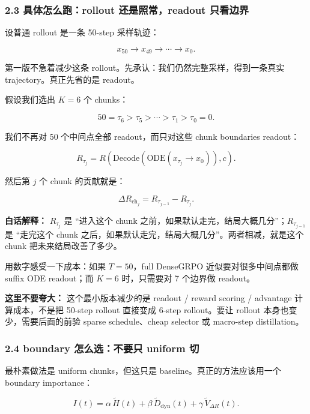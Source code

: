 \subsubsection{2.3 具体怎么跑：rollout 还是照常，readout 只看边界}

设普通 rollout 是一条 50-step 采样轨迹：

\[
x_{50}\rightarrow x_{49}\rightarrow\cdots\rightarrow x_0.
\]

第一版不急着减少这条 rollout。先承认：我们仍然完整采样，得到一条真实 trajectory。真正先省的是 readout。

假设我们选出 \(K=6\) 个 chunks：

\[
50=\tau_6>\tau_5>\cdots>\tau_1>\tau_0=0.
\]

我们不再对 50 个中间点全部 readout，而只对这些 chunk boundaries readout：

\[
R_{\tau_j}
=
R\left(
\mathrm{Decode}\left(
\mathrm{ODE}(x_{\tau_j}\rightarrow x_0)
\right),c
\right).
\]

然后第 \(j\) 个 chunk 的贡献就是：

\[
\Delta R_{\mathrm{ch}_j}
=
R_{\tau_{j-1}}-R_{\tau_j}.
\]

\begin{intubox}
\textbf{白话解释：} \(R_{\tau_j}\) 是 ``进入这个 chunk 之前，如果默认走完，结局大概几分''；\(R_{\tau_{j-1}}\) 是 ``走完这个 chunk 之后，如果默认走完，结局大概几分''。两者相减，就是这个 chunk 把未来结局改善了多少。
\end{intubox}

用数字感受一下成本：如果 \(T=50\)，full DenseGRPO 近似要对很多中间点都做 suffix ODE readout；而 \(K=6\) 时，只需要对 7 个边界做 readout。

\begin{warnbox}
\textbf{这里不要夸大：} 这个最小版本减少的是 readout / reward scoring / advantage 计算成本，不是把 50-step rollout 直接变成 6-step rollout。要让 rollout 本身也变少，需要后面的前验 sparse schedule、cheap selector 或 macro-step distillation。
\end{warnbox}

\subsubsection{2.4 boundary 怎么选：不要只 uniform 切}

最朴素做法是 uniform chunks，但这只是 baseline。真正的方法应该用一个 boundary importance：

\[
I(t)
=
\alpha\,\widetilde{H}(t)
+\beta\,\widetilde{D}_{\mathrm{dyn}}(t)
+\gamma\,\widetilde{V}_{\Delta R}(t).
\]

